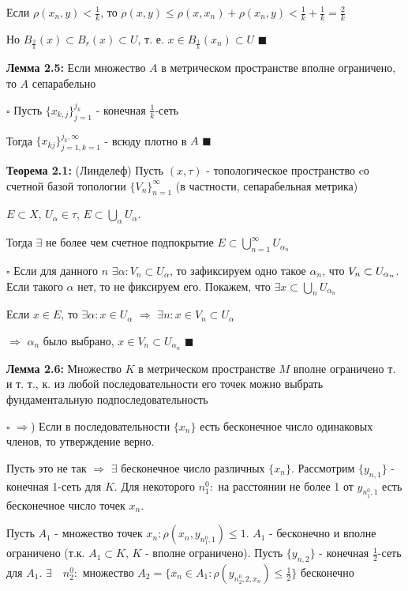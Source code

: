 \documentclass[a4paper]{report}
\newcommand*{\hm}[1]{#1\nobreak\discretionary{}%
            {\hbox{$\mathsurround=0pt #1$}}{}}
\begin{document}
Если $\rho(x_n,y)<\frac1k$, то $\rho(x,y)\le\rho(x,x_n)+\rho(x_n,y)<
\frac1k+\frac1k=\frac2k$

Но $B_{\frac2k}(x)\subset B_r(x)\subset U$, т. е. $x\in B_{\frac1k}(x_n)\subset U$ $\blacksquare$
\bigskip

\noindent\textbf{Лемма 2.5:} Если множество $A$ в метрическом пространстве вполне ограничено, то $A$ сепарабельно

\noindent $\square$ Пусть $\{x_{k,j}\}_{j=1}^{j_k}$ - конечная $\frac1k$-сеть

Тогда $\{x_{kj}\}_{j=1,k=1}^{j_k,\infty}$ - всюду плотно в $A$ $\blacksquare$
\bigskip

\noindent\textbf{Теорема 2.1:} (Линделеф) Пусть $(x,\tau)$ - топологическое пространство cо счетной базой топологии 
$\{V_n\}_{n=1}^\infty$ (в частности, сепарабельная метрика) 

$E\subset X$, $U_\alpha\in\tau$, $E\subset\bigcup\limits_\alpha
U_\alpha$. 

Тогда $\exists$ не более чем счетное подпокрытие $E\subset\bigcup\limits_{n=1}^\infty U_{\alpha_n}$

\noindent $\square$ Если для данного $n$ $\exists\alpha\colon V_n\subset U_\alpha$, то зафиксируем одно такое $\alpha_n$, 
что $V_n\hm\subset U_{\alpha_n}$. Если такого $\alpha$ нет, то не фиксируем его. Покажем, что $\exists x\subset
\bigcup\limits_n U_{\alpha_n}$

 Если $x\in E$, то $\exists\alpha\colon x\in U_\alpha$ $\Rightarrow$ $\exists n\colon x\in
V_n\subset U_\alpha$

$\Rightarrow$ $\alpha_n$ было выбрано, $x\in V_n\subset U_{\alpha_n}$ $\blacksquare$
\bigskip

\noindent\textbf{Лемма 2.6:} Множество $K$ в метрическом пространстве $M$ вполне ограничено т. и т. т., к. из любой 
последовательности его точек можно выбрать фундаментальную подпоследовательность

\noindent $\square$ $\Rightarrow$) Если в последовательности $\{x_n\}$ есть бесконечное число одинаковых членов, то 
утверждение верно. 

Пусть это не так $\Rightarrow$ $\exists$ бесконечное число различных $\{x_n\}$. Рассмотрим $\{y_{n,1}\}$ - конечная 
1-сеть для $K$. Для некоторого $n_1^0\colon$ на расстоянии не более 1 от $y_{n_1^0,1}$ есть бесконечное число точек $x_n$.

Пусть $A_1$ - множество точек $x_n\colon\rho(x_n,y_{n_1^0,1})\le1$. $A_1$ - бесконечно и вполне ограничено (т.к. $A_1
\subset K$, $K$ - вполне ограничено). Пусть $\{y_{n,2}\}$ - конечная $\frac12$-сеть для $A_1$. $\exists\quad n_2^0\colon$ 
множество $A_2=\{x_n\in A_1\colon\rho(y_{n_2^0,2,x_n})\le\frac12\}$ бесконечно
\end{document}
